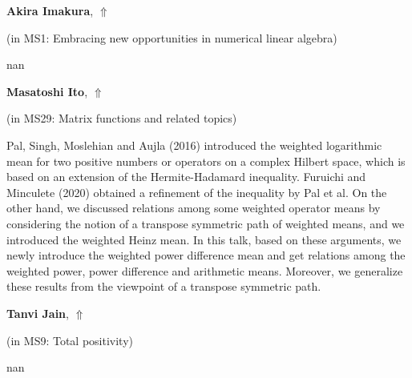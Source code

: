 \documentclass[ILAS2025-program.tex]{subfiles}
\begin{document}
     \hypertarget{down0349}{}\begin{ilasabstract}
    
    \textbf{Akira Imakura},  \hfill \hyperlink{up0349}{$\Uparrow$}
    
    (in {\color{mstitle}MS1: Embracing new opportunities in numerical linear algebra})
        
        \mtskip
    nan\end{ilasabstract}
     \hypertarget{down0046}{}\begin{ilasabstract}
    
    \textbf{Masatoshi Ito},  \hfill \hyperlink{up0046}{$\Uparrow$}
    
    (in {\color{mstitle}MS29: Matrix functions and related topics})
        
        \mtskip
    Pal, Singh, Moslehian and Aujla (2016) introduced the weighted logarithmic mean for two positive numbers
 or operators on a complex Hilbert space, which is based on an extension of the Hermite-Hadamard inequality.
Furuichi and Minculete (2020) obtained a refinement of the inequality by Pal et al.
On the other hand, we discussed relations among some weighted operator means
 by considering the notion of a transpose symmetric path of weighted means,
 and we introduced the weighted Heinz mean.
In this talk, based on these arguments,
 we  newly introduce the weighted power difference mean and get relations
 among the weighted power, power difference and arithmetic means.
Moreover, we generalize these results from the viewpoint of a transpose symmetric path.

\end{ilasabstract}
     \hypertarget{down0122}{}\begin{ilasabstract}
    
    \textbf{Tanvi Jain},  \hfill \hyperlink{up0122}{$\Uparrow$}
    
    (in {\color{mstitle}MS9: Total positivity})
        
        \mtskip
    nan\end{ilasabstract}
\end{document}
